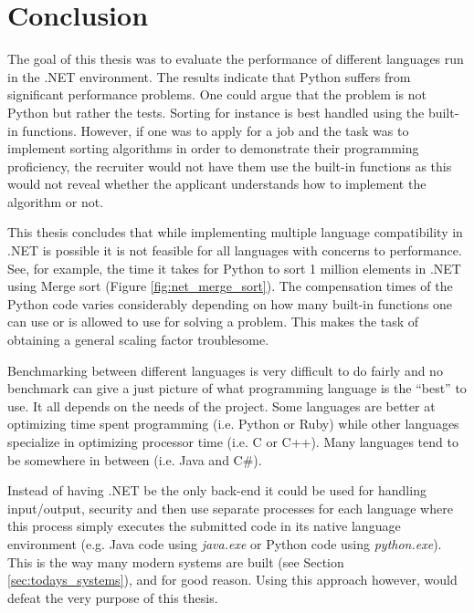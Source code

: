 \section{Conclusion}
The goal of this thesis was to evaluate the performance of different languages run in the .NET environment. The results indicate that Python suffers from significant performance problems. One could argue that the problem is not Python but rather the tests. Sorting for instance is best handled using the built-in functions. However, if one was to apply for a job and the task was to implement sorting algorithms in order to demonstrate their programming proficiency, the recruiter would not have them use the built-in functions as this would not reveal whether the applicant understands how to implement the algorithm or not.

This thesis concludes that while implementing multiple language compatibility in .NET is possible it is not feasible for all languages with concerns to performance. See, for example, the time it takes for Python to sort 1 million elements in .NET using Merge sort (Figure \ref{fig:net_merge_sort}). The compensation times of the Python code varies considerably depending on how many built-in functions one can use or is allowed to use for solving a problem. This makes the task of obtaining a general scaling factor troublesome.

Benchmarking between different languages is very difficult to do fairly and no benchmark can give a just picture of what programming language is the ``best'' to use. It all depends on the needs of the project. Some languages are better at optimizing time spent programming (i.e. Python or Ruby) while other languages specialize in optimizing processor time (i.e. C or C++). Many languages tend to be somewhere in between (i.e. Java and C\#).

Instead of having .NET be the only back-end it could be used for handling input/output, security and then use separate processes for each language where this process simply executes the submitted code in its native language environment (e.g. Java code using \textit{java.exe} or Python code using \textit{python.exe}). This is the way many modern systems are built (see Section \ref{sec:todays_systems}), and for good reason. Using this approach however, would defeat the very purpose of this thesis.
